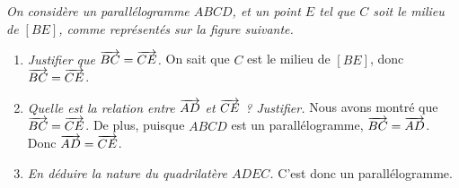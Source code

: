\documentclass[12pt]{article}
\begin{document}
\begin{exercice}
  \emph{On considère un parallélogramme $ABCD$, et un point $E$ tel que $C$ soit le
  milieu de $\left[ BE \right]$, comme représentés sur la figure suivante.}

  \begin{center}
  \end{center}
  \begin{enumerate}
    \item \emph{Justifier que $\overrightarrow{BC}=\overrightarrow{CE}$.} On sait que $C$ est le milieu de $\left[ BE \right]$, donc $\overrightarrow{BC}=\overrightarrow{CE}$.
    \item \emph{Quelle est la relation entre $\overrightarrow{AD}$ et $\overrightarrow{CE}$ ? Justifier.} Nous avons montré que $\overrightarrow{BC}=\overrightarrow{CE}$. De plus, puisque $ABCD$ est un parallélogramme, $\overrightarrow{BC}=\overrightarrow{AD}$. Donc $\overrightarrow{AD}=\overrightarrow{CE}$.
    \item \emph{En déduire la nature du quadrilatère $ADEC$.} C'est donc un parallélogramme.
  \end{enumerate}
\end{exercice}
\end{document}
